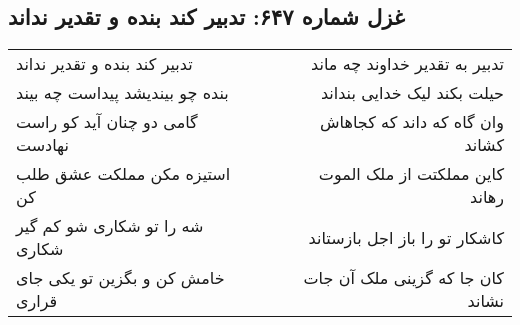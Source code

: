 \begin{center}
\section*{غزل شماره ۶۴۷: تدبیر کند بنده و تقدیر نداند}
\label{sec:0647}
\begin{longtable}{l p{0.5cm} r}
تدبیر کند بنده و تقدیر نداند
&&
تدبیر به تقدیر خداوند چه ماند
\\
بنده چو بیندیشد پیداست چه بیند
&&
حیلت بکند لیک خدایی بنداند
\\
گامی دو چنان آید کو راست نهادست
&&
وان گاه که داند که کجاهاش کشاند
\\
استیزه مکن مملکت عشق طلب کن
&&
کاین مملکتت از ملک الموت رهاند
\\
شه را تو شکاری شو کم گیر شکاری
&&
کاشکار تو را باز اجل بازستاند
\\
خامش کن و بگزین تو یکی جای قراری
&&
کان جا که گزینی ملک آن جات نشاند
\\
\end{longtable}
\end{center}
